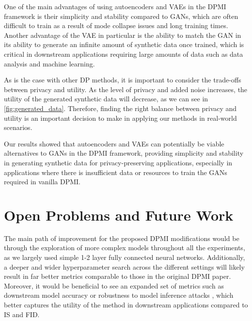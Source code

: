 \documentclass{article}
\begin{document}
One of the main advantages of using autoencoders and VAEs in the DPMI framework is their simplicity and stability compared to GANs, which are often difficult to train as a result of mode collapse issues and long training times. Another advantage of the VAE in particular is the ability to match the GAN in its ability to generate an infinite amount of synthetic data once trained, which is critical in downstream applications requiring large amounts of data such as data analysis and machine learning. 

As is the case with other DP methods, it is important to consider the trade-offs between privacy and utility. As the level of privacy and added noise increases, the utility of the generated synthetic data will decrease, as we can see in \ref{fig:generated_data}. Therefore, finding the right balance between privacy and utility is an important decision to make in applying our methods in real-world scenarios.

Our results showed that autoencoders and VAEs can potentially be viable alternatives to GANs in the DPMI framework, providing simplicity and stability in generating synthetic data for privacy-preserving applications, especially in applications where there is insufficient data or resources to train the GANs required in vanilla DPMI. 



\section{Open Problems and Future Work}
The main path of improvement for the proposed DPMI modifications would be through the exploration of more complex models throughout all the experiments, as we largely used simple 1-2 layer fully connected neural networks. Additionally, a deeper and wider hyperparameter search across the different settings will likely result in far better metrics comparable to those in the original DPMI paper. Moreover, it would be beneficial to see an expanded set of metrics such as downstream model accuracy or robustness to model inference attacks \cite{mi_attack} \cite{mi_attack_gan}, which better captures the utility of the method in downstream applications compared to IS and FID.
\end{document}
